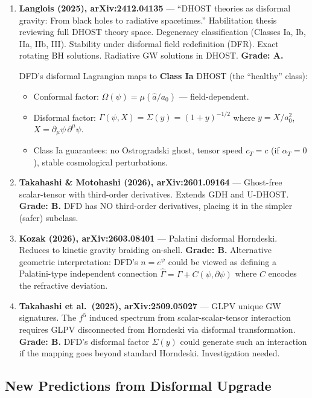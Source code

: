 \documentclass[11pt,a4paper]{article}
\begin{document}
\begin{enumerate}

\item \textbf{Langlois (2025), arXiv:2412.04135} --- ``DHOST theories as disformal gravity: From black holes to radiative spacetimes.'' Habilitation thesis reviewing full DHOST theory space. Degeneracy classification (Classes Ia, Ib, IIa, IIb, III). Stability under disformal field redefinition (DFR). Exact rotating BH solutions. Radiative GW solutions in DHOST. \textbf{Grade: A.}

DFD's disformal Lagrangian maps to \textbf{Class Ia} DHOST (the ``healthy'' class):
\begin{itemize}
\item Conformal factor: $\Omega(\psi) = \mu(\hat{a}/a_0)$ --- field-dependent.
\item Disformal factor: $\Gamma(\psi, X) = \Sigma(y) = (1+y)^{-1/2}$ where $y = X/a_0^2$, $X = \partial_\mu\psi\,\partial^\mu\psi$.
\item Class Ia guarantees: no Ostrogradski ghost, tensor speed $c_T = c$ (if $\alpha_T = 0$), stable cosmological perturbations.
\end{itemize}

\item \textbf{Takahashi \& Motohashi (2026), arXiv:2601.09164} --- Ghost-free scalar-tensor with third-order derivatives. Extends GDH and U-DHOST. \textbf{Grade: B.} DFD has NO third-order derivatives, placing it in the simpler (safer) subclass.

\item \textbf{Kozak (2026), arXiv:2603.08401} --- Palatini disformal Horndeski. Reduces to kinetic gravity braiding on-shell. \textbf{Grade: B.} Alternative geometric interpretation: DFD's $n = e^\psi$ could be viewed as defining a Palatini-type independent connection $\hat{\Gamma} = \Gamma + C(\psi, \partial\psi)$ where $C$ encodes the refractive deviation.

\item \textbf{Takahashi et al.\ (2025), arXiv:2509.05027} --- GLPV unique GW signatures. The $f^5$ induced spectrum from scalar-scalar-tensor interaction requires GLPV disconnected from Horndeski via disformal transformation. \textbf{Grade: B.} DFD's disformal factor $\Sigma(y)$ could generate such an interaction if the mapping goes beyond standard Horndeski. Investigation needed.

\end{enumerate}

\subsection{New Predictions from Disformal Upgrade}
\end{document}
